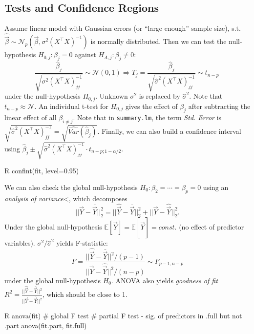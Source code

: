 \subsection{Tests and Confidence Regions}\label{subsec:tests_and_confidence_regions}
\begin{sectionbox}[T-test]\nospacing{}
  Assume linear model with Gaussian errors (or ``large enough'' sample size), s.t. $\hat{\vec{\beta}} \sim \mathcal{N}_{p}\left(\vec{\beta}, \sigma^{2}{(X^{\top}X)}^{-1}\right)$ is normally distributed.
  Then we can test the null-hypothesis $H_{0,j}: \beta_{j} = 0$ against $H_{A,j}: \beta_{j} \neq 0$:
  \[\frac{\hat \beta_{j}}{\sqrt{\sigma^{2}{{(X^{\top}X)}^{-1}_{jj}}}} \sim \mathcal{N}(0,1) \Rightarrow  T_{j} = \frac{\hat \beta_{j}}{\sqrt{\hat \sigma^{2}{{(X^{\top}X)}^{-1}_{jj}}}} \sim t_{n-p}\ \] under the null-hypothesis $H_{0,j}$. Unknown $\sigma^{2}$ is replaced by $\hat \sigma^{2}$. Note that $t_{n-p} \approx \mathcal{N}$.
  An individual t-test for $H_{0,j}$ gives the effect of $\beta_{j}$ after subtracting the linear effect of all $\beta_{i\neq j}$.
  Note that in \verb!summary.lm!, the term \emph{Std. Error} is $\sqrt{\hat \sigma^{2}{{(X^{\top}X)}^{-1}_{jj}}} = \sqrt{\hat{Var}(\hat \beta_{j})}$. Finally, we can also build a confidence interval using $\hat \beta_{j} \pm \sqrt{\hat \sigma^{2}{{(X^{\top}X)}^{-1}_{jj}}} \cdot t_{n-p;1-\alpha/2}$.
\begin{mintlinebox}{R}
  confint(fit, level=0.95)
\end{mintlinebox}
\end{sectionbox}

\begin{sectionbox}\nospacing{}
  We can also check the global null-hypothesis $H_{0}: \beta_{2} = \cdots = \beta_{p} = 0$ using an \emph{analysis of variance}<, which decomposes
  \[||\vec{Y} - \bar{\vec{Y}}||^{2}_{2} = ||\hat{\vec{Y}} - \bar{\vec{Y}}||^{2}_{2} + ||\vec{Y} - \hat{\vec{Y}}||^{2}_{2}.\]
  Under the global null-hypothesis $\mathbb{E}[\vec{Y}] = \mathbb{E}[\bar{\vec{Y}}] = const$. (no effect of predictor variables). $\sigma^{2}/ \hat \sigma^{2}$ yields F-statistic:
  \[F = \frac{||\hat{\vec{Y}} - \bar{\vec{Y}}||^{2}/(p-1)}{||\vec{Y} - \hat{\vec{Y}}||^{2} / (n-p)} \sim F_{p-1,n-p}\] under the global null-hypothesis $H_{0}$.
  ANOVA also yields \emph{goodness of fit} $R^{2} = \frac{||\hat{\vec{Y}} - \bar{\vec{Y}}||^{2}}{||\vec{Y} - \bar{\vec{Y}}||^{2}}$, which should be close to 1.
\begin{mintlinebox}{R}
  anova(fit) # global F test
  # partial F test - sig. of predictors in .full but not .part
  anova(fit.part, fit.full)
\end{mintlinebox}
\end{sectionbox}

